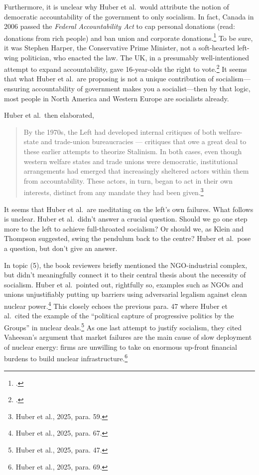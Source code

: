 \documentclass[12pt]{article}
\begin{document}
Furthermore, it is unclear why Huber et al.\ would attribute the notion of democratic accountability of the government to only socialism. In fact, Canada in 2006 passed the \emph{Federal Accountability Act} to cap personal donations (read: donations from rich people) and ban union and corporate donations.\footcite{governmentofcanadaFederalAccountabilityAct2025} To be sure, it was Stephen Harper, the Conservative Prime Minister, not a soft-hearted left-wing politician, who enacted the law. The UK, in a presumably well-intentioned attempt to expand accountability, gave 16-year-olds the right to vote.\footcite{ministryofhousingcommunitiesandlocalgovernment16YearOlds2025} It seems that what Huber et al.\ are proposing is not a unique contribution of socialism---ensuring accountability of government makes you a socialist---then by that logic, most people in North America and Western Europe are socialists already.

Huber et al.\ then elaborated,

\begin{quotation}
	By the 1970s, the Left had developed internal critiques of both welfare-state and trade-union bureaucracies — critiques that owe a great deal to these earlier attempts to theorize Stalinism. In both cases, even though western welfare states and trade unions were democratic, institutional arrangements had emerged that increasingly sheltered actors within them from accountability. These actors, in turn, began to act in their own interests, distinct from any mandate they had been given.\footnote{Huber et al., 2025, para. 59.}
\end{quotation}

It seems that Huber et al.\ are meditating on the left's own failures. What follows is unclear. Huber et al.\ didn't answer a crucial question. Should we go one step more to the left to achieve full-throated socialism? Or should we, as Klein and Thompson suggested, swing the pendulum back to the centre? Huber et al.\ pose a question, but don't give an answer.

In topic (5), the book reviewers briefly mentioned the NGO-industrial complex, but didn't meaningfully connect it to their central thesis about the necessity of socialism. Huber et al.\ pointed out, rightfully so, examples such as NGOs and unions unjustifiably putting up barriers using adversarial legalism against clean nuclear power.\footnote{Huber et al., 2025, para. 67.} This closely echoes the previous para. 47 where Huber et al.\ cited the example of the ``political capture of progressive politics by the Groups'' in nuclear deals.\footnote{Huber et al., 2025, para. 47.} As one last attempt to justify socialism, they cited Vaheesan's argument that market failures are the main cause of slow deployment of nuclear energy: firms are unwilling to take on enormous up-front financial burdens to build nuclear infrastructure.\footnote{Huber et al., 2025, para. 69.}
\end{document}
